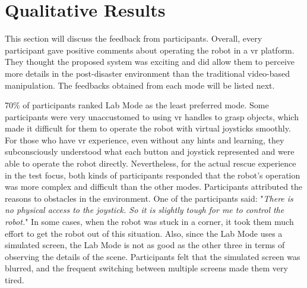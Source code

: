 \section{Qualitative Results}
This section will discuss the feedback from participants. Overall, every participant gave positive comments about operating the robot in a \gls{vr} platform. They thought the proposed system was exciting and did allow them to perceive more details in the post-disaster environment than the traditional video-based manipulation. The feedbacks obtained from each mode will be listed next.

70\% of participants ranked Lab Mode as the least preferred mode. Some participants were very unaccustomed to using \gls{vr} handles to grasp objects, which made it difficult for them to operate the robot with virtual joysticks smoothly. For those who have \gls{vr} experience, even without any hints and learning, they subconsciously understood what each button and joystick represented and were able to operate the robot directly. Nevertheless, for the actual rescue experience in the test focus, both kinds of participants responded that the robot's operation was more complex and difficult than the other modes. Participants attributed the reasons to obstacles in the environment. One of the participants said: "\textit{There is no physical access to the joystick. So it is slightly tough for me to control the robot.}" In some cases, when the robot was stuck in a corner, it took them much effort to get the robot out of this situation. Also, since the Lab Mode uses a simulated screen, the Lab Mode is not as good as the other three in terms of observing the details of the scene. Participants felt that the simulated screen was blurred, and the frequent switching between multiple screens made them very tired. 

